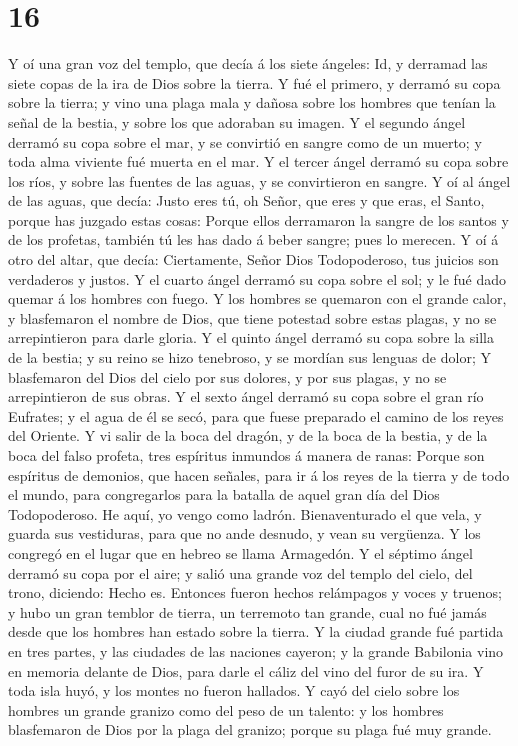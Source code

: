\hypertarget{section-15}{%
\section{16}\label{section-15}}

 Y oí una gran voz del templo, que decía á los siete
ángeles: Id, y derramad las siete copas de la ira de Dios sobre la
tierra.  Y fué el primero, y derramó su copa sobre la
tierra; y vino una plaga mala y dañosa sobre los hombres que tenían la
señal de la bestia, y sobre los que adoraban su imagen.  Y
el segundo ángel derramó su copa sobre el mar, y se convirtió en sangre
como de un muerto; y toda alma viviente fué muerta en el mar.
 Y el tercer ángel derramó su copa sobre los ríos, y sobre
las fuentes de las aguas, y se convirtieron en sangre.  Y
oí al ángel de las aguas, que decía: Justo eres tú, oh Señor, que eres y
que eras, el Santo, porque has juzgado estas cosas: 
Porque ellos derramaron la sangre de los santos y de los profetas,
también tú les has dado á beber sangre; pues lo merecen. 
Y oí á otro del altar, que decía: Ciertamente, Señor Dios Todopoderoso,
tus juicios son verdaderos y justos.  Y el cuarto ángel
derramó su copa sobre el sol; y le fué dado quemar á los hombres con
fuego.  Y los hombres se quemaron con el grande calor, y
blasfemaron el nombre de Dios, que tiene potestad sobre estas plagas, y
no se arrepintieron para darle gloria.  Y el quinto ángel
derramó su copa sobre la silla de la bestia; y su reino se hizo
tenebroso, y se mordían sus lenguas de dolor;  Y
blasfemaron del Dios del cielo por sus dolores, y por sus plagas, y no
se arrepintieron de sus obras.  Y el sexto ángel derramó
su copa sobre el gran río Eufrates; y el agua de él se secó, para que
fuese preparado el camino de los reyes del Oriente.  Y vi
salir de la boca del dragón, y de la boca de la bestia, y de la boca del
falso profeta, tres espíritus inmundos á manera de ranas:
 Porque son espíritus de demonios, que hacen señales,
para ir á los reyes de la tierra y de todo el mundo, para congregarlos
para la batalla de aquel gran día del Dios Todopoderoso. 
He aquí, yo vengo como ladrón. Bienaventurado el que vela, y guarda sus
vestiduras, para que no ande desnudo, y vean su vergüenza.
 Y los congregó en el lugar que en hebreo se llama
Armagedón.  Y el séptimo ángel derramó su copa por el
aire; y salió una grande voz del templo del cielo, del trono, diciendo:
Hecho es.  Entonces fueron hechos relámpagos y voces y
truenos; y hubo un gran temblor de tierra, un terremoto tan grande, cual
no fué jamás desde que los hombres han estado sobre la tierra.
 Y la ciudad grande fué partida en tres partes, y las
ciudades de las naciones cayeron; y la grande Babilonia vino en memoria
delante de Dios, para darle el cáliz del vino del furor de su ira.
 Y toda isla huyó, y los montes no fueron hallados.
 Y cayó del cielo sobre los hombres un grande granizo
como del peso de un talento: y los hombres blasfemaron de Dios por la
plaga del granizo; porque su plaga fué muy grande.

